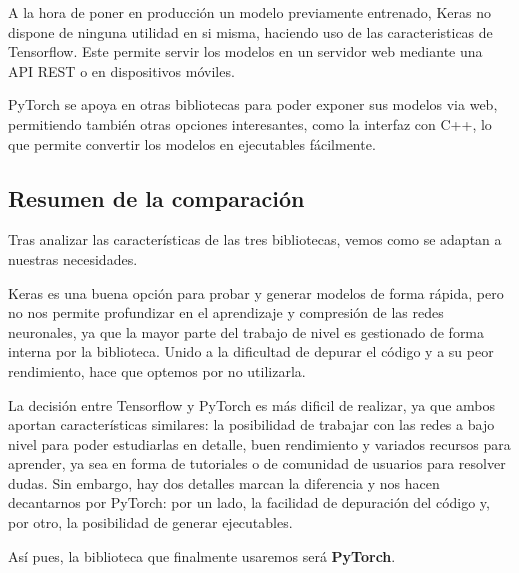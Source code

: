 A la hora de poner en producción un modelo previamente entrenado, Keras
no dispone de ninguna utilidad en si misma, haciendo uso de las
caracteristicas de Tensorflow. Este permite servir los modelos en un
servidor web mediante una API REST o en dispositivos móviles.

PyTorch se apoya en otras bibliotecas para poder exponer sus modelos via
web, permitiendo también otras opciones interesantes, como la interfaz
con C++, lo que permite convertir los modelos en ejecutables fácilmente.

\subsection{Resumen de la comparación }\label{decision-final}

Tras analizar las características de las tres bibliotecas, vemos como se
adaptan a nuestras necesidades.

Keras es una buena opción para probar y generar modelos de forma rápida,
pero no nos permite profundizar en el aprendizaje y compresión de las
redes neuronales, ya que la mayor parte del trabajo de nivel es
gestionado de forma interna por la biblioteca. Unido a la dificultad de
depurar el código y a su peor rendimiento, hace que optemos por no
utilizarla.

La decisión entre Tensorflow y PyTorch es más dificil de realizar, ya
que ambos aportan características similares: la posibilidad de trabajar
con las redes a bajo nivel para poder estudiarlas en detalle, buen
rendimiento y variados recursos para aprender, ya sea en forma de
tutoriales o de comunidad de usuarios para resolver dudas. Sin embargo,
hay dos detalles marcan la diferencia y nos hacen decantarnos por
PyTorch: por un lado, la facilidad de depuración del código y, por otro,
la posibilidad de generar ejecutables.

Así pues, la biblioteca que finalmente usaremos será \textbf{PyTorch}.
